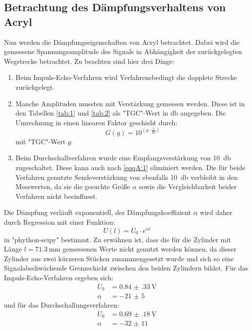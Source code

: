 \subsection{Betrachtung des Dämpfungsverhaltens von Acryl}
Nun werden die Dämpfungseigenschaften von Acryl betrachtet. Dabei wird die gemessene
Spannungsamplitude des Signals in Abhängigkeit der zurückgelegten Wegstrecke betrachtet.
Zu beachten sind hier drei Dinge:
\begin{enumerate}
  \item Beim Impuls-Echo-Verfahren wird Verfahrensbedingt die dopplete Strecke zurückgelegt.
  \item Manche Amplituden mussten mit Verstärkung gemessen werden. Diese ist in den Tabellen
  \ref{tab:1} und \ref{tab:2} als "TGC"-Wert in \si{\decibel} angegeben. Die Umrechnung in einen
  linearen Faktor geschieht durch:
  \begin{equation}
    G(g) = 10^{ \left( g \cdot \frac{1}{20} \right)}
    \label{eqqA:1}
  \end{equation}
  mit "TGC"-Wert $g$.
  \item Beim Durchschallverfahren wurde eine Empfangsverstärkung von \SI{10}{\decibel}
  zugeschaltet. Diese kann auch nach \ref{eqqA:1} eliminiert werden. Die für beide Verfahren
  genutzte Sendeverstärkung von ebenfalls \SI{10}{\decibel} verbleibt in den Messwerten,
  da sie die gesuchte Größe $\alpha$ sowie die Vergleichbarkeit beider Verfahren nicht beeinflusst.
\end{enumerate}
Die Dämpfung verläuft exponentiell, der Dämpfungskoeffizient $\alpha$ wird daher durch Regression
mit einer Funktion:
\begin{equation}
  U(l) = U_0 \cdot e^{\alpha l}
\end{equation}
in "phython-scipy" bestimmt. Zu erwähnen ist, dass die für die Zylinder mit Länge
$l=\SI{71.3}{\milli\metre}$ gemessenen Werte nicht genutzt werden können, da dieser
Zylinder aus zwei kürzeren Stücken zusammengesetzt wurde und sich so eine Signalabschwächende
Grenzschicht zwischen den beiden Zylindern bildet. Für das Impuls-Echo-Verfahren ergeben sich:
\begin{align*}
  U_0 &= \SI{0.84(33)}{\volt}\\
  \alpha &= \num{-21(5)}
\end{align*}
und für das Durchschallungsverfahren:
\begin{align*}
  U_0 &= \SI{0.69(18)}{\volt}\\
  \alpha &= \num{-32(11)}
\end{align*}

